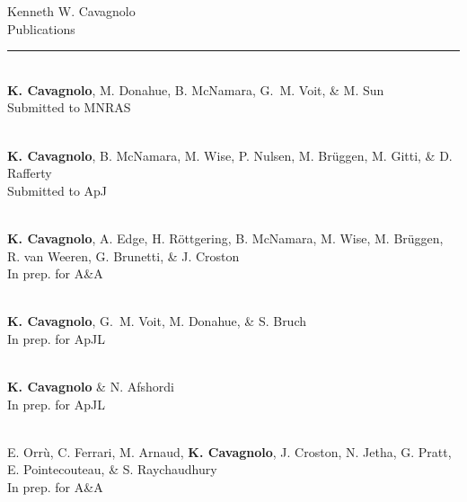 \documentclass[12pt]{cv}
\begin{document}
\begin{center}
{\Large Kenneth W. Cavagnolo\\Publications}
\rule{\linewidth}{1pt}
\normalsize
\end{center}

\begin{llist}
\vspace{-0.5cm}


{}\\
{\bf K. Cavagnolo}, M. Donahue, B. McNamara, G.~M. Voit, \& M. Sun\\
Submitted to MNRAS

{}\\
{\bf K. Cavagnolo}, B. McNamara, M. Wise, P. Nulsen, M. Br\"uggen, M. Gitti, \& D. Rafferty\\
Submitted to ApJ



{}\\
{\bf{K. Cavagnolo}}, A. Edge, H. R\"ottgering, B. McNamara, M. Wise, M. Br\"uggen, R. van Weeren, G. Brunetti, \& J. Croston\\
In prep. for A\&A

{}\\
{\bf K. Cavagnolo}, G.~M. Voit, M. Donahue, \& S. Bruch\\
In prep. for ApJL

{}\\
{\bf K. Cavagnolo} \& N. Afshordi\\
In prep. for ApJL

{}\\
E. Orr\`u, C. Ferrari, M. Arnaud, {\bf K. Cavagnolo}, J. Croston, N. Jetha, G. Pratt, E. Pointecouteau, \& S. Raychaudhury\\
In prep. for A\&A


\end{llist}
\end{document}

